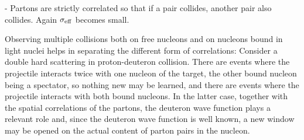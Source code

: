 \documentclass{ws-rv9x6}
\begin{document}
 \par{}- Partons are strictly correlated so that if a pair collides, another pair also collides. Again $\sigma_{\rm eff}$ becomes small.
\par
Observing multiple collisions both on free nucleons and on nucleons bound in light nuclei helps in separating the different form of correlations:
Consider a double hard scattering in proton-deuteron collision\cite{Calucci:2010wg}. There are events where the projectile interacts twice with one nucleon of the target, the other bound nucleon being a spectator, so nothing new may be learned, and there are events where the projectile interacts with both bound nucleons. In the latter case, together with the spatial correlations of the partons, the deuteron wave function plays a relevant role and, since the deuteron wave function is well known, a new window may be opened on the actual content of parton pairs in the nucleon. 
\end{document}
